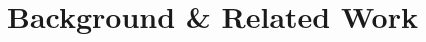 \chapter{Background \& Related Work}
\label{ch:Background}

\newcommand{\ea}[2]{#1 \text{et al.} #2}









